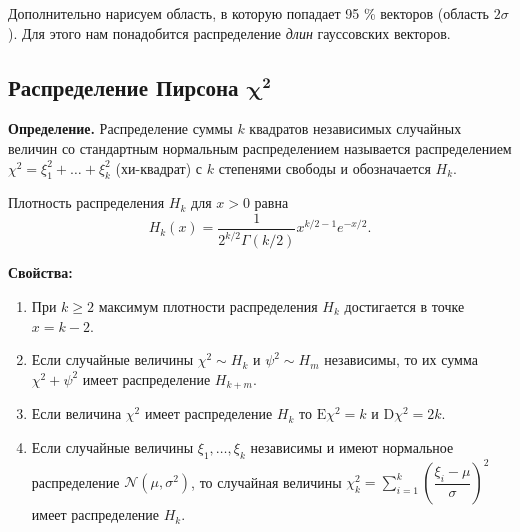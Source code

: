 \documentclass[11pt,a4paper]{article}
\providecommand{\tightlist}{%
      \setlength{\itemsep}{0pt}\setlength{\parskip}{0pt}}
\begin{document}
    \begin{center}
    \end{center}
    
    Дополнительно нарисуем область, в которую попадает 95 \% векторов
(область \(2\sigma\)). Для этого нам понадобится распределение
\emph{длин} гауссовских векторов.

    \hypertarget{ux440ux430ux441ux43fux440ux435ux434ux435ux43bux435ux43dux438ux435-ux43fux438ux440ux441ux43eux43dux430-mathbfchi2}{%
\subsection{\texorpdfstring{Распределение Пирсона
\(\mathbf{\chi^2}\)}{Распределение Пирсона \textbackslash mathbf\{\textbackslash chi\^{}2\}}}\label{ux440ux430ux441ux43fux440ux435ux434ux435ux43bux435ux43dux438ux435-ux43fux438ux440ux441ux43eux43dux430-mathbfchi2}}

\textbf{Определение.} Распределение суммы \(k\) квадратов независимых
случайных величин со стандартным нормальным распределением называется
распределением \(\chi^2 = \xi_1^2 + \ldots + \xi_k^2\) (хи-квадрат) с
\(k\) степенями свободы и обозначается \(H_k\).

Плотность распределения \(H_k\) для \(x>0\) равна \[
  H_k(x) = \dfrac{1}{2^{k/2}\Gamma(k/2)} x^{k/2-1} e^{-x/2}.
\]

    \textbf{Свойства:}

\begin{enumerate}
\def\labelenumi{\arabic{enumi}.}
\tightlist
\item
  При \(k\ge2\) максимум плотности распределения \(H_k\) достигается в
  точке \(x=k-2\).
\item
  Если случайные величины \(\chi^2 \sim H_k\) и \(\psi^2 \sim H_m\)
  независимы, то их сумма \(\chi^2 + \psi^2\) имеет распределение
  \(H_{k+m}\).
\item
  Если величина \(\chi^2\) имеет распределение \(H_k\) то
  \(\mathrm{E} \chi^2 = k\) и \(\mathrm{D} \chi^2 = 2k\).
\item
  Если случайные величины \(\xi_1, \ldots, \xi_k\) независимы и имеют
  нормальное распределение \(\mathcal{N}(\mu, \sigma^2)\), то случайная
  величины
  \(\chi_k^2 = \sum\limits_{i=1}^{k} \left( \dfrac{\xi_i-\mu}{\sigma} \right)^2\)
  имеет распределение \(H_k\).
\end{enumerate}
\end{document}
